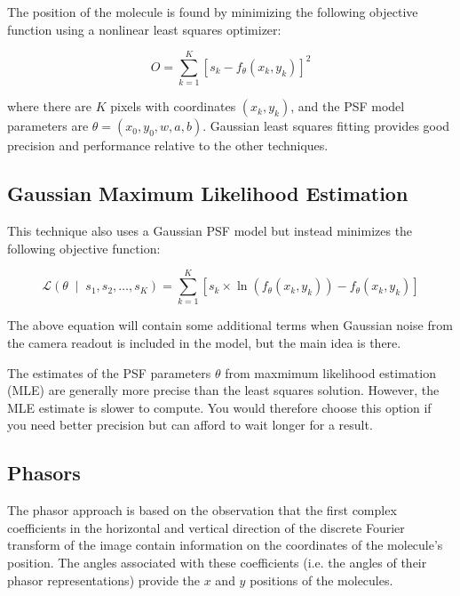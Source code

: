 \documentclass[10pt,a4paper,oneside]{book}
\newcommand{\given}{\;\middle|\;}
\begin{document}
The position of the molecule is found by minimizing the following objective function using a nonlinear least squares optimizer:

\begin{equation}
    O = \sum_{k=1}^K \left[ s_k - f_{\theta} \left(x_k, y_k\right)\right]^2
\end{equation}

\noindent where there are $K$ pixels with coordinates $\left( x_k, y_k\right)$, and the PSF model parameters are $\theta = \left( x_0, y_0, w, a, b \right)$. Gaussian least squares fitting provides good precision and performance relative to the other techniques.

\subsection{Gaussian Maximum Likelihood Estimation}

This technique also uses a Gaussian PSF model but instead minimizes the following objective function:

\begin{equation}
    \mathcal{L} \left(\theta \given s_1, s_2, \ldots, s_K \right) = \sum_{k=1}^K \left[ s_k \times \ln \left( f_{\theta} \left( x_k, y_k \right) \right) - f_{\theta} \left( x_k, y_k \right) \right]
\end{equation}

\noindent The above equation will contain some additional terms when Gaussian noise from the camera readout is included in the model, but the main idea is there.

The estimates of the PSF parameters $\theta$ from maxmimum likelihood estimation (MLE) are generally more precise than the least squares solution. However, the MLE estimate is slower to compute. You would therefore choose this option if you need better precision but can afford to wait longer for a result.

\subsection{Phasors}

The phasor approach is based on the observation that the first complex coefficients in the horizontal and vertical direction of the discrete Fourier transform of the image contain information on the coordinates of the molecule's position. The angles associated with these coefficients (i.e. the angles of their phasor representations) provide the $x$ and $y$ positions of the molecules.
\end{document}
